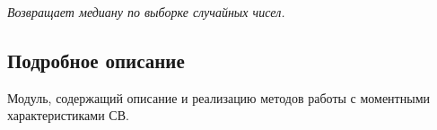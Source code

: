 \begin{DoxyCompactItemize}
\begin{DoxyCompactList}\small\item\em Возвращает медиану по выборке случайных чисел. \end{DoxyCompactList}\end{DoxyCompactItemize}


\subsection{Подробное описание}
Модуль, содержащий описание и реализацию методов работы с моментными характеристиками СВ. 